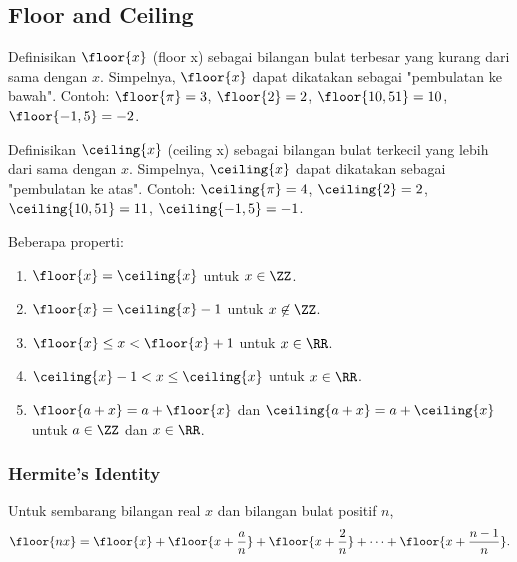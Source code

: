  \subsection{Floor and Ceiling}
Definisikan $\floor{x}$ (floor x) sebagai bilangan bulat terbesar yang kurang dari sama dengan $x$. Simpelnya, $\floor{x}$ dapat dikatakan sebagai "pembulatan ke bawah". Contoh: $\floor{\pi}=3$, $\floor{2}=2$, $\floor{10,51}=10$, $\floor{-1,5}=-2$.

Definisikan $\ceiling{x}$ (ceiling x) sebagai bilangan bulat terkecil yang lebih dari sama dengan $x$. Simpelnya, $\ceiling{x}$ dapat dikatakan sebagai "pembulatan ke atas". Contoh: $\ceiling{\pi}=4$, $\ceiling{2}=2$, $\ceiling{10,51}=11$, $\ceiling{-1,5}=-1$.

Beberapa properti:
\begin{enumerate}
    \item $\floor{x}=\ceiling{x}$ untuk $x \in \ZZ$.
    \item $\floor{x}=\ceiling{x}-1$ untuk $x \not \in \ZZ$.
    \item $\floor{x} \le  x < \floor{x}+1$ untuk $x \in \RR$.
    \item $\ceiling{x}-1 < x \le \ceiling{x}$ untuk $x \in \RR$.
    \item $\floor{a+x}=a+\floor{x}$ dan $\ceiling{a+x}=a+\ceiling{x}$ untuk $a\in \ZZ$ dan $x \in \RR$.
\end{enumerate}

\subsubsection{Hermite's Identity}
Untuk sembarang bilangan real $x$ dan bilangan bulat positif $n$,
$$\floor{nx}=\floor{x}+\floor{x+\dfrac{a}{n}}+\floor{x+\dfrac{2}{n}}+\dots+\floor{x+\dfrac{n-1}{n}}.$$

